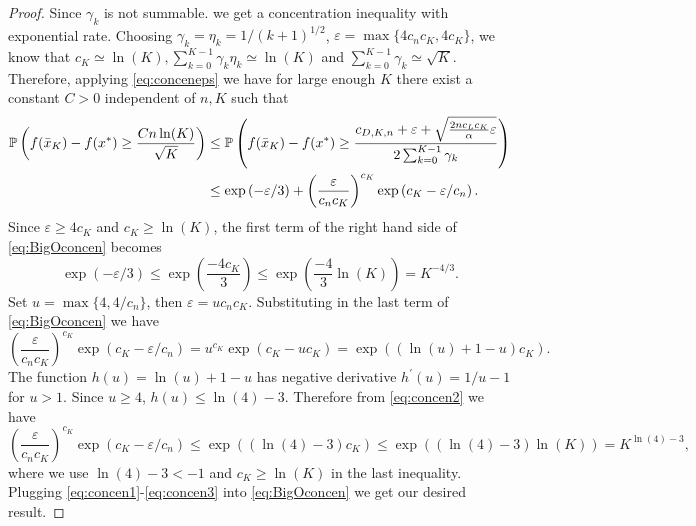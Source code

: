\documentclass[11pt,reqno]{amsart}
\newcommand{\1}{{\bf 1}}
\newcommand{\2}{{\bf 2}}
\newcommand{\al}{\alpha}
\numberwithin{equation}{section}
\theoremstyle{remark}
\begin{document}
{\begin{proof}
		
		Since $\gamma_k$ is not summable. we get a concentration inequality with exponential rate.
		Choosing $\gamma_k=\eta_k=1/(k+1)^{1/2}$, $\varepsilon=\max\{4c_nc_K,4c_K\}$, we know that $c_K \simeq \ln(K), \sum_{k=0}^{K-1}\gamma_k\eta_k\simeq \ln(K)$ and $\sum_{k=0}^{K-1}\gamma_k\simeq \sqrt{K}$. Therefore, applying \eqref{eq:conceneps} we have for large enough $K$ there exist a constant $C>0$ independent of $n,K$ such that
		\begin{align}\label{eq:BigOconcen}
			\notag\mathbb{P}\left(f(\bar{x}_K)-f(x^*)\geq\frac{Cn\ln(K)}{\sqrt{K}}\right) & \le 
			\mathbb{P}\left(f(\bar{x}_K)-f(x^*)\geq \frac{c_{D,K,n}+\varepsilon+\sqrt{\frac{2nc_Lc_K}{\al}\varepsilon}}{2\sum_{k=0}^{K-1} \gamma_k}\right)  \\
			& \leq \exp\left(-\varepsilon/3\right)+\left(\frac{\varepsilon}{c_nc_K}\right)^{c_K}\exp\left(c_K-\varepsilon/c_n\right).
		\end{align}
		Since $\varepsilon\geq4c_K$ and $c_K\geq \ln(K)$, the first term of the right hand side of \eqref{eq:BigOconcen} becomes
		\begin{equation}\label{eq:concen1}
			\exp\left(-\varepsilon/3\right)\leq\exp\left(\frac{-4c_K}{3}\right)\leq \exp\left(\frac{-4}{3}\ln (K)\right)=K^{-4/3}.
		\end{equation}
		Set $u=\max\{4,4/c_n\}$, then $\varepsilon=uc_nc_K$. Substituting in the last term of \eqref{eq:BigOconcen} we have
		\begin{equation}\label{eq:concen2}
			\left(\frac{\varepsilon}{c_nc_K}\right)^{c_K}\exp\left(c_K-\varepsilon/c_n\right)=u^{c_K}\exp\left(c_K-uc_K\right)=\exp\left(\left(\ln (u)+1-u\right)c_K\right).
		\end{equation}
		The function $h(u)=\ln(u)+1-u$ has negative derivative $h^{\prime}(u)=1/u-1$ for $u>1$. Since $u\geq4$, $h(u)\leq\ln(4)-3$. Therefore from \eqref{eq:concen2} we have 
		\begin{equation}\label{eq:concen3}
			\left(\frac{\varepsilon}{c_nc_K}\right)^{c_K}\exp\left(c_K-\varepsilon/c_n\right)\leq\exp\left((\ln(4)-3)c_K\right)\leq\exp\left((\ln(4)-3)\ln(K)\right)=K^{\ln(4)-3},
		\end{equation}
		where we use $\ln(4)-3<-1$ and $c_K\geq \ln(K)$ in the last inequality. Plugging \eqref{eq:concen1}-\eqref{eq:concen3} into \eqref{eq:BigOconcen} we get our desired result.
		

\end{proof}}
\end{document}
